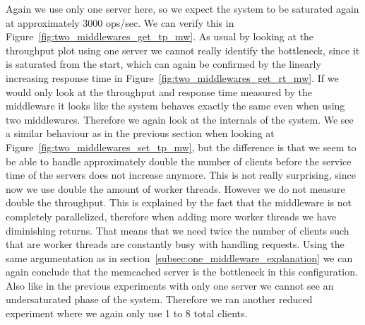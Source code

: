 \documentclass[11pt,a4paper]{article}
\begin{document}
Again we use only one server here, so we expect the system to be saturated again at approximately 3000 ops/sec.
%
We can verify this in Figure~\ref{fig:two_middlewares_get_tp_mw}.
%
As usual by looking at the throughput plot using one server we cannot really identify the bottleneck, since it is saturated from the start, which can again be confirmed by the linearly increasing response time in Figure~\ref{fig:two_middlewares_get_rt_mw}.
%
If we would only look at the throughput and response time measured by the middleware it looks like the system behaves exactly the same even when using two middlewares.
%
Therefore we again look at the internals of the system.
%
We see a similar behaviour as in the previous section when looking at Figure~\ref{fig:two_middlewares_set_tp_mw}, but the difference is that we seem to be able to handle approximately double the number of clients before the service time of the servers does not increase anymore.
%
This is not really surprising, since now we use double the amount of worker threads.
%
However we do not measure double the throughput.
%
This is explained by the fact that the middleware is not completely parallelized, therefore when adding more worker threads we have diminishing returns.
%
That means that we need twice the number of clients such that are worker threads are constantly busy with handling requests.
%
Using the same argumentation as in section~\ref{subsec:one_middleware_explanation} we can again conclude that the memcached server is the bottleneck in this configuration.
%
Also like in the previous experiments with only one server we cannot see an undersaturated phase of the system.
%
Therefore we ran another reduced experiment where we again only use 1 to 8 total clients.
%
\end{document}
